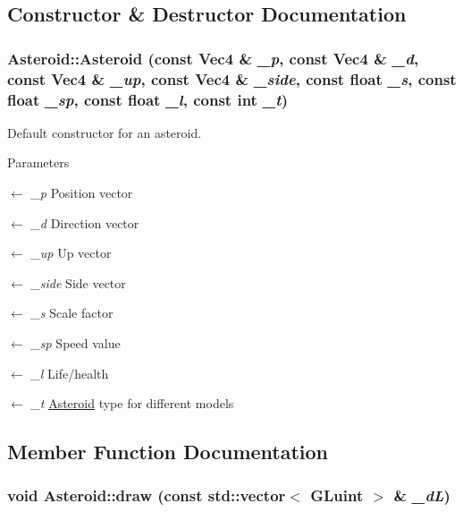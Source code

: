 \subsection{Constructor \& Destructor Documentation}
\hypertarget{classAsteroid_a73e0331aafe2bdd1683446cfa20895de}{
\subsubsection[{Asteroid}]{\setlength{\rightskip}{0pt plus 5cm}Asteroid::Asteroid (const {\bf Vec4} \& {\em \_\-p}, \/  const {\bf Vec4} \& {\em \_\-d}, \/  const {\bf Vec4} \& {\em \_\-up}, \/  const {\bf Vec4} \& {\em \_\-side}, \/  const float {\em \_\-s}, \/  const float {\em \_\-sp}, \/  const float {\em \_\-l}, \/  const int {\em \_\-t})}}
\label{classAsteroid_a73e0331aafe2bdd1683446cfa20895de}


Default constructor for an asteroid. 
\begin{DoxyParams}{Parameters}
\item[\mbox{$\leftarrow$} {\em \_\-p}]Position vector \item[\mbox{$\leftarrow$} {\em \_\-d}]Direction vector \item[\mbox{$\leftarrow$} {\em \_\-up}]Up vector \item[\mbox{$\leftarrow$} {\em \_\-side}]Side vector \item[\mbox{$\leftarrow$} {\em \_\-s}]Scale factor \item[\mbox{$\leftarrow$} {\em \_\-sp}]Speed value \item[\mbox{$\leftarrow$} {\em \_\-l}]Life/health \item[\mbox{$\leftarrow$} {\em \_\-t}]\hyperlink{classAsteroid}{Asteroid} type for different models \end{DoxyParams}


\subsection{Member Function Documentation}
\hypertarget{classAsteroid_a1eab739445111f8736a2e7610645a7b2}{
\subsubsection[{draw}]{\setlength{\rightskip}{0pt plus 5cm}void Asteroid::draw (const std::vector$<$ GLuint $>$ \& {\em \_\-dL})}}
\label{classAsteroid_a1eab739445111f8736a2e7610645a7b2}


